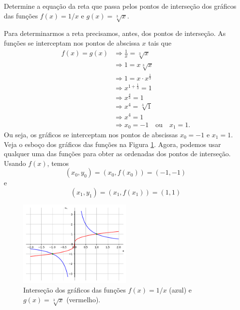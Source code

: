 \begin{exeresol}\label{exeresol:funpot_intersep}
  Determine a equação da reta que passa pelos pontos de interseção dos gráficos das funções $f(x) = 1/x$ e $g(x) = \sqrt[3]{x}$.
\end{exeresol}
\begin{resol}
  Para determinarmos a reta precisamos, antes, dos pontos de interseção. As funções se interceptam nos pontos de abscissa $x$ tais que
  \begin{align}
    f(x) = g(x) &\Rightarrow \frac{1}{x} = \sqrt[3]{x}\\
                &\Rightarrow 1 = x\sqrt[3]{x}\\
                &\Rightarrow 1 = x\cdot x^{\frac{1}{3}}\\
                &\Rightarrow x^{1+\frac{1}{3}} = 1\\
                &\Rightarrow x^{\frac{4}{3}} = 1\\
                &\Rightarrow x^4 = \sqrt[3]{1}\\
                &\Rightarrow x^4 = 1\\
                &\Rightarrow x_0 = -1\quad\text{ou}\quad x_1=1.
  \end{align}
  Ou seja, os gráficos se interceptam nos pontos de abscissas $x_0 = -1$ e $x_1 = 1$. Veja o esboço dos gráficos das funções na Figura \ref{fig:exeresol_funpot_intersep}. Agora, podemos usar qualquer uma das funções para obter as ordenadas dos pontos de interseção. Usando $f(x)$, temos
  \begin{equation}
    (x_0, y_0) = (x_0, f(x_0)) = (-1, -1)
  \end{equation}
  e
  \begin{equation}
     (x_1, y_1) = (x_1, f(x_1)) = (1, 1)
  \end{equation}

  \begin{figure}[H]
    \centering
    \includegraphics[width=0.5\textwidth]{./cap_funcao/dados/fig_exeresol_funpot_intersep/fig_exeresol_funpot_intersep}
    \caption{Interseção dos gráficos das funções $f(x) = 1/x$ (azul) e $g(x) = \sqrt[3]{x}$ (vermelho).}
    \label{fig:exeresol_funpot_intersep}
  \end{figure}


\end{resol}
